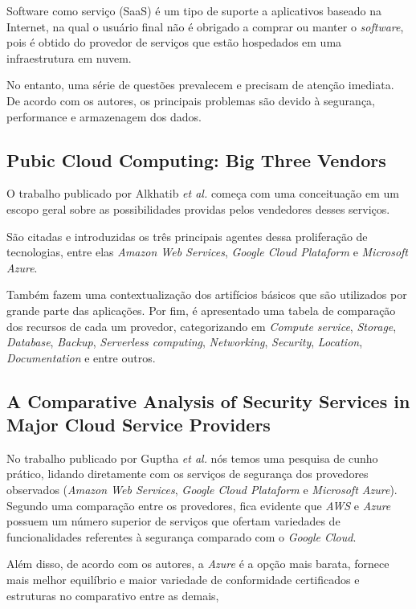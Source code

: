 \documentclass[12pt]{article}
\begin{document}
Software como serviço (SaaS) é um tipo de suporte a aplicativos baseado na Internet, na qual o usuário final não é obrigado a comprar ou manter o \emph{software}, pois é obtido do provedor de serviços que estão hospedados em uma infraestrutura em nuvem.

No entanto, uma série de questões prevalecem e precisam de atenção imediata. De acordo com os autores, os principais problemas são devido à segurança, performance e armazenagem dos dados.

\subsection{Pubic Cloud Computing: Big Three Vendors \cite{randa}}

O trabalho publicado por Alkhatib \emph{et al.} começa com uma conceituação em um escopo geral sobre as possibilidades providas pelos vendedores desses serviços.

São citadas e introduzidas os três principais agentes dessa proliferação de tecnologias, entre elas \emph{Amazon Web Services}, \emph{Google Cloud Plataform} e \emph{Microsoft Azure}.

Também fazem uma contextualização dos artifícios básicos que são utilizados por grande parte das aplicações. Por fim, é apresentado uma tabela de comparação dos recursos de cada um provedor, categorizando em \emph{Compute service}, \emph{Storage}, \emph{Database}, \emph{Backup}, \emph{Serverless computing}, \emph{Networking}, \emph{Security}, \emph{Location}, \emph{Documentation} e entre outros.

\subsection{A Comparative Analysis of Security Services in Major Cloud Service Providers \cite{guptha}}

No trabalho publicado por Guptha \emph{et al.} nós temos uma pesquisa de cunho prático, lidando diretamente com os serviços de segurança dos provedores observados (\emph{Amazon Web Services}, \emph{Google Cloud Plataform} e \emph{Microsoft Azure}). Segundo uma comparação entre os provedores, fica evidente que \emph{AWS} e \emph{Azure} possuem um número superior de serviços que ofertam variedades de funcionalidades referentes à segurança comparado com o \emph{Google Cloud}.

Além disso, de acordo com os autores, a \emph{Azure} é a opção mais barata, fornece mais melhor equilíbrio e maior variedade de conformidade
certificados e estruturas no comparativo entre as demais, 
\end{document}
